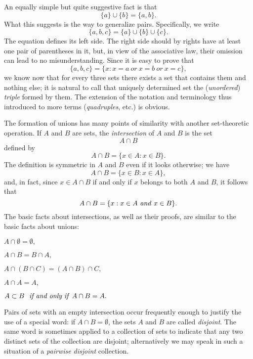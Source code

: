 An equally simple but quite suggestive fact is that 
\begin{equation*}
\{ a \} \cup \{ b \} = \{ a, b \}.
\end{equation*}
What this suggests is the way to generalize pairs. Specifically, we write 
\begin{equation*}
 \{ a, b, c \} = \{ a \} \cup \{ b \} \cup \{ c \}.
\end{equation*}
The equation defines its left side. The right side should by rights have at least one pair of parentheses in it, but, in view of the associative law, their omission can lead to no misunderstanding. Since it is easy to prove that 
\begin{equation*}
 \{ a, b, c \} = \{ x: x = a \: or \: x = b \: or \: x = c \},
\end{equation*}
we know now that for every three sets there exists a set that contains them and nothing else; it is natural to call that uniquely determined set the (\textit{unordered}) \textit{triple} formed by them. The extension of the notation and terminology thus introduced to more terms (\textit{quadruples}, etc.) is obvious.

The formation of unions has many points of similarity with another set-theoretic operation. If $A$ and $B$ are sets, the \textit{intersection} of $A$ and $B$ is the set 
\begin{equation*}
A \cap B
\end{equation*}
defined by 
\begin{equation*}
A \cap B = \{ x \in A: x \in B \}.
\end{equation*}
The definition is symmetric in $A$ and $B$ even if it looks otherwise; we have 
\begin{equation*}
A \cap B = \{ x \in B: x \in A \},
\end{equation*}
and, in fact, since $x \in A \cap B$ if and only if $x$ belongs to both $A$ and $B$, it follows that 
\begin{equation*}
A \cap B = \{x: x \in A \text{ \textit{and} } x \in B \}.
\end{equation*}
The basic facts about intersections, as well as their proofs, are similar to the basic facts about unions:
\begin{center}
$A \cap \emptyset = \emptyset ,$

$ A \cap B =  B \cap A,$

$A \cap (B \cap C) = (A \cap B) \cap C,$

$A \cap A = A,$

$A \subset B \text{ \textit{ if and only if} } A \cap B = A.$
\end{center}
Pairs of sets with an empty intersection occur frequently enough to justify the use of a special word: if $A \cap B =  \emptyset $, the sets $A$ and $B$ are called \textit{disjoint}. The same word is sometimes applied to a collection of sets to indicate that any two distinct sets of the collection are disjoint; alternatively we may speak in such a situation of a \textit{pairwise disjoint} collection.
 
